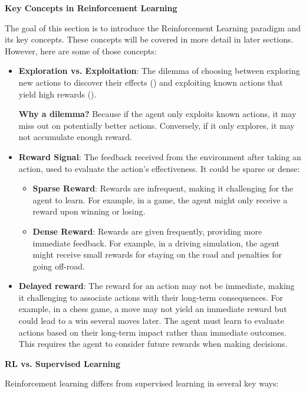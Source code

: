 \highspace
\begin{flushleft}
    \textcolor{Green3}{ \textbf{Key Concepts in Reinforcement Learning}}
\end{flushleft}
The goal of this section is to introduce the Reinforcement Learning paradigm and its key concepts. These concepts will be covered in more detail in later sections. However, here are some of those concepts:
\begin{itemize}
    \item \textbf{Exploration vs. Exploitation}: The dilemma of choosing between exploring new actions to discover their effects () and exploiting known actions that yield high rewards ().
    
    \textcolor{Green3}{ \textbf{Why a dilemma?}} Because if the agent only exploits known actions, it may miss out on potentially better actions. Conversely, if it only explores, it may not accumulate enough reward.


    \item \textbf{Reward Signal}: The feedback received from the environment after taking an action, used to evaluate the action's effectiveness. It could be sparse or dense:
    \begin{itemize}
        \item \textbf{Sparse Reward}: Rewards are infrequent, making it challenging for the agent to learn. For example, in a game, the agent might only receive a reward upon winning or losing.
        \item \textbf{Dense Reward}: Rewards are given frequently, providing more immediate feedback. For example, in a driving simulation, the agent might receive small rewards for staying on the road and penalties for going off-road.
    \end{itemize}
    
    
    \item \textbf{Delayed reward}: The reward for an action may not be immediate, making it challenging to associate actions with their long-term consequences. For example, in a chess game, a move may not yield an immediate reward but could lead to a win several moves later. The agent must learn to evaluate actions based on their long-term impact rather than immediate outcomes. This requires the agent to consider future rewards when making decisions.
\end{itemize}

\highspace
\begin{flushleft}
    \textcolor{Green3}{ \textbf{RL vs. Supervised Learning}}
\end{flushleft}
Reinforcement learning differs from supervised learning in several key ways:

